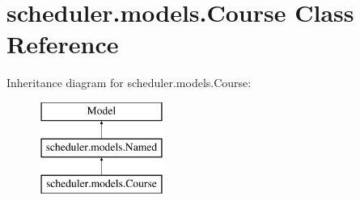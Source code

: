 \hypertarget{classscheduler_1_1models_1_1_course}{\section{scheduler.\-models.\-Course Class Reference}
\label{classscheduler_1_1models_1_1_course}
}
Inheritance diagram for scheduler.\-models.\-Course\-:\begin{figure}[H]
\begin{center}
\leavevmode
\includegraphics[height=3.000000cm]{classscheduler_1_1models_1_1_course}
\end{center}
\end{figure}
